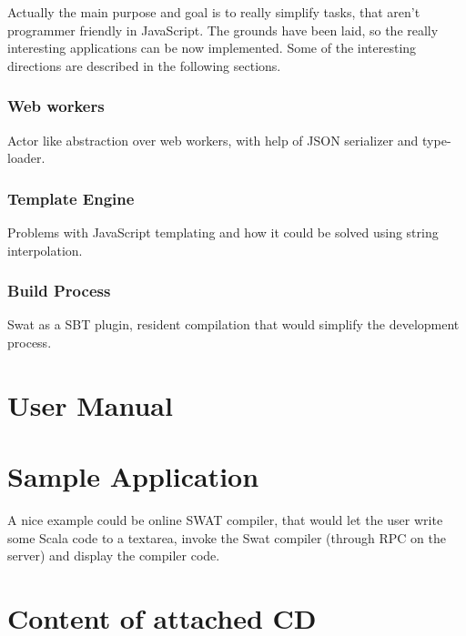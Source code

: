 \documentclass[12pt,a4paper]{report}
\begin{document}
Actually the main purpose and goal is to really simplify tasks, that aren't programmer friendly in JavaScript. The grounds have been laid, so the really interesting applications can be now implemented. Some of the interesting directions are described in the following sections.

\subsection{Web workers}

Actor like abstraction over web workers, with help of JSON serializer and type-loader.

\subsection{Template Engine}

Problems with JavaScript templating and how it could be solved using string interpolation.

\subsection{Build Process}

Swat as a SBT plugin, resident compilation that would simplify the development process.



\def\bibname{Bibliography}







\appendix
\appendixpage
\addappheadtotoc

\chapter{User Manual}

\chapter{Sample Application}

A nice example could be online SWAT compiler, that would let the user write some Scala code to a textarea, invoke the Swat compiler (through RPC on the server) and display the compiler code.



\chapter{Content of attached CD}





\printnomenclature
\end{document}
